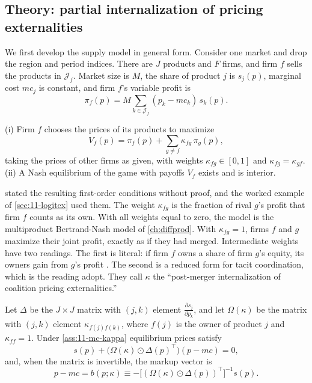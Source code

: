 \subsection{Theory: partial internalization of pricing externalities}\label{sec:11-mc-theory}

We first develop the supply model in general form. Consider one market and drop the region and period indices. There
are $J$ products and $F$ firms, and firm $f$ sells the products in $\mathcal{J}_f$. Market size is $M$, the share of
product $j$ is $s_j(p)$, marginal cost $mc_j$ is constant, and firm $f$'s variable profit is
\begin{equation}\label{eq:11-mc-profit}
  \pi_f(p) = M\sum_{k \in \mathcal{J}_f}(p_k - mc_k)\, s_k(p).
\end{equation}

\begin{assumption}\label{ass:11-mc-kappa}
(i) Firm $f$ chooses the prices of its products to maximize
\begin{equation}\label{eq:11-mc-objective}
  V_f(p) = \pi_f(p) + \sum_{g \neq f}\kappa_{fg}\,\pi_g(p),
\end{equation}
taking the prices of other firms as given, with weights $\kappa_{fg} \in [0,1]$ and $\kappa_{fg} = \kappa_{gf}$.
(ii) A Nash equilibrium of the game with payoffs $V_f$ exists and is interior.
\end{assumption}

 stated the resulting first-order conditions without proof, and the worked example of
\cref{sec:11-logitex} used them. The weight $\kappa_{fg}$ is the fraction of rival $g$'s profit that firm $f$ counts
as its own. With all weights
equal to zero, the model is the multiproduct Bertrand-Nash model of \cref{ch:diffprod}. With $\kappa_{fg} = 1$, firms
$f$ and $g$ maximize their joint profit, exactly as if they had merged. Intermediate weights have two readings. The
first is literal: if firm $f$ owns a share of firm $g$'s equity, its owners gain from $g$'s profit
\citep{OBrienSalop2000}. The second is a reduced form for tacit coordination, which is the reading
\citet[p.~1779]{MillerWeinberg2017} adopt. They call $\kappa$ the ``post-merger internalization of coalition pricing
externalities.''

\begin{proposition}\label{prop:11-mc-foc}
Let $\Delta$ be the $J \times J$ matrix with $(j,k)$ element $\frac{\partial s_j}{\partial p_k}$, and let $\Omega(\kappa)$
be the matrix with $(j,k)$ element $\kappa_{f(j)f(k)}$, where $f(j)$ is the owner of product $j$ and $\kappa_{ff} = 1$.
Under \cref{ass:11-mc-kappa} equilibrium prices satisfy
\begin{equation}\label{eq:11-mc-foc}
  s(p) + \big(\Omega(\kappa) \odot \Delta(p)^\top\big)(p - mc) = 0 ,
\end{equation}
and, when the matrix is invertible, the markup vector is
\begin{equation}\label{eq:11-mc-markup}
  p - mc = b(p;\kappa) \equiv -\big[(\Omega(\kappa) \odot \Delta(p))^\top\big]^{-1} s(p).
\end{equation}
\end{proposition}


